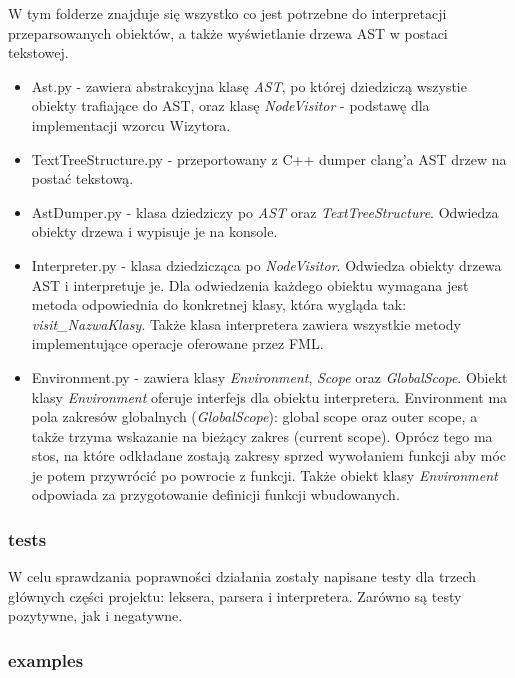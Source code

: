 \documentclass[12pt,a4paper]{article}
\begin{document}
W tym folderze znajduje się wszystko co jest potrzebne do interpretacji przeparsowanych obiektów, a także wyświetlanie drzewa AST w postaci tekstowej.

\begin{itemize}

\item Ast.py - zawiera abstrakcyjna klasę \emph{AST}, po której dziedziczą wszystie obiekty trafiające do AST, oraz klasę \emph{NodeVisitor} - podstawę dla implementacji wzorcu Wizytora.

\item TextTreeStructure.py - przeportowany z C++ dumper clang'a AST drzew na postać tekstową.

\item AstDumper.py - klasa dziedziczy po \emph{AST} oraz \emph{TextTreeStructure}. Odwiedza obiekty drzewa i wypisuje je na konsole.

\item Interpreter.py - klasa dziedzicząca po \emph{NodeVisitor}. Odwiedza obiekty drzewa AST i interpretuje je. Dla odwiedzenia każdego obiektu wymagana jest metoda odpowiednia do konkretnej klasy, która wygląda tak: \emph{visit\_NazwaKlasy}. Także klasa interpretera zawiera wszystkie metody implementujące operacje oferowane przez FML.

\item Environment.py - zawiera klasy \emph{Environment}, \emph{Scope} oraz \emph{GlobalScope}. Obiekt klasy \emph{Environment} oferuje interfejs dla obiektu interpretera. Environment ma pola zakresów globalnych (\emph{GlobalScope}): global scope oraz outer scope, a także trzyma wskazanie na bieżący zakres (current scope). Oprócz tego ma stos, na które odkładane zostają zakresy sprzed wywołaniem funkcji aby móc je potem przywrócić po powrocie z funkcji. Także obiekt klasy \emph{Environment} odpowiada za przygotowanie definicji funkcji wbudowanych.

\end{itemize}

\subsubsection{tests}

W celu sprawdzania poprawności działania zostały napisane testy dla trzech głównych części projektu: leksera, parsera i interpretera. Zarówno są testy pozytywne, jak i negatywne. 

\subsubsection{examples}
\end{document}
